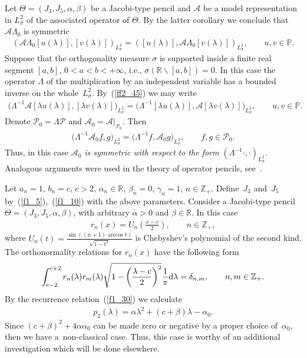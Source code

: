 \documentclass[pdftex]{sigma}
\numberwithin{equation}{section}
\begin{document}
Let $\Theta=(J_3,J_5,\alpha,\beta)$ be a Jacobi-type pencil and $\mathcal{A}$ be a model representation in $L^2_\sigma$ of the associated operator of $\Theta$. By the latter corollary we conclude that $\mathcal{A} \Lambda_0$ is symmetric
\begin{gather}\label{ff2_45}
(\mathcal{A} \Lambda_0 [u(\lambda)], [v(\lambda)])_{L^2_\sigma} = ([u(\lambda)], \mathcal{A} \Lambda_0 [v(\lambda)])_{L^2_\sigma},\qquad
u,v\in\mathbb{P}.
\end{gather}
Suppose that the orthogonality measure $\sigma$ is supported inside a f\/inite real segment $[a,b]$, $0 < a < b < +\infty$, i.e.,
$\sigma(\mathbb{R}\backslash[a,b]) = 0$.
In this case the operator $\Lambda$ of the multiplication by an independent variable has a bounded inverse on the whole~$L^2_\sigma$. By~(\ref{ff2_45}) we may write
\begin{gather*} \big(\Lambda^{-1} \mathcal{A} [\lambda u(\lambda)], [\lambda v(\lambda)]\big)_{L^2_\sigma} =
\big(\Lambda^{-1} [\lambda u(\lambda)], \mathcal{A} [\lambda v(\lambda)]\big)_{L^2_\sigma},\qquad u,v \in\mathbb{P}. \end{gather*}
Denote $\mathcal{P}_0 = \Lambda \mathcal{P}$ and $\mathcal{A}_0 = \mathcal{A}|_{\mathcal{P}_0}$. Then
\begin{gather*} \big(\Lambda^{-1} \mathcal{A}_0 f,g\big)_{L^2_\sigma} = \big(\Lambda^{-1} f, \mathcal{A}_0 g\big)_{L^2_\sigma},\qquad f,g \in\mathcal{P}_0. \end{gather*}
Thus, in this case \textit{$\mathcal{A}_0$ is symmetric with respect to the form $(\Lambda^{-1}\cdot,\cdot)_{L^2_\sigma}$}. Analogous arguments were used in the theory of operator pencils, see~\cite[Chapter~IV, p.~163]{cit_7000_Markus}.

\begin{Example}\label{ee2_1} Let $a_n = 1$, $b_n = c$, $c>2$, $\alpha_n\in\mathbb{R}$, $\beta_n = 0$, $\gamma_n = 1$, $n\in\mathbb{Z}_+$. Def\/ine~$J_3$ and~$J_5$ by~(\ref{f1_5}),~(\ref{f1_10}) with the above parameters. Consider a Jacobi-type pencil $\Theta = (J_3,J_5,\alpha,\beta)$, with arbitrary $\alpha > 0$ and $\beta\in\mathbb{R}$. In this case
\begin{gather*} r_n(x) = U_n\left( \frac{x-c}{2} \right),\qquad n\in\mathbb{Z}_+, \end{gather*}
where $U_n(t) = \frac{\sin((n+1)\arccos t)}{ \sqrt{1-t^2} }$ is Chebyshev's polynomial of the second kind. The orthonormality relations for $r_n(x)$ have the following form
\begin{gather*} \int_{c-2}^{c+2} r_n(\lambda) r_m(\lambda) \sqrt{1 - \left( \frac{\lambda - c}{2} \right)^2} \frac{1}{\pi} {\rm d}\lambda
= \delta_{n,m},\qquad n,m\in\mathbb{Z}_+. \end{gather*}
By the recurrence relation~(\ref{f1_30}) we calculate
\begin{gather*} p_2(\lambda) = \alpha \lambda^2 + (c+\beta) \lambda - \alpha_0. \end{gather*}
Since $(c+\beta)^2 + 4 \alpha\alpha_0$ can be made zero or negative by a proper choice of~$\alpha_0$, then we have a~non-classical case. Thus, this case is worthy of an additional investigation which will be done elsewhere.
\end{Example}
\end{document}
